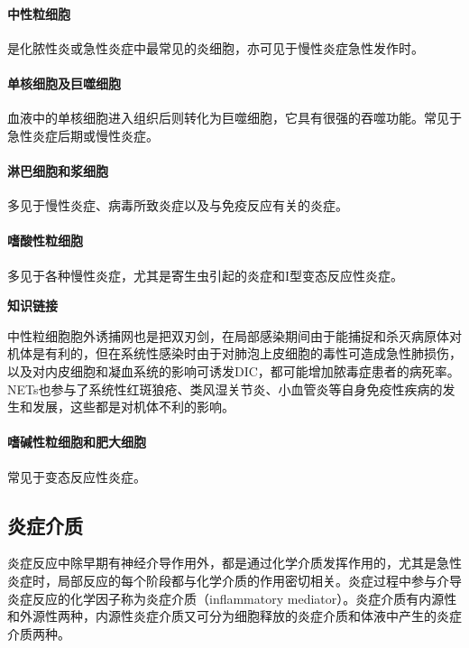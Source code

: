 \paragraph{中性粒细胞}
是化脓性炎或急性炎症中最常见的炎细胞，亦可见于慢性炎症急性发作时。

\paragraph{单核细胞及巨噬细胞}
血液中的单核细胞进入组织后则转化为巨噬细胞，它具有很强的吞噬功能。常见于急性炎症后期或慢性炎症。

\paragraph{淋巴细胞和浆细胞}
多见于慢性炎症、病毒所致炎症以及与免疫反应有关的炎症。

\paragraph{嗜酸性粒细胞}
多见于各种慢性炎症，尤其是寄生虫引起的炎症和I型变态反应性炎症。

\begin{center}
  \textbf{知识链接}
\end{center}

中性粒细胞胞外诱捕网也是把双刃剑，在局部感染期间由于能捕捉和杀灭病原体对机体是有利的，但在系统性感染时由于对肺泡上皮细胞的毒性可造成急性肺损伤，以及对内皮细胞和凝血系统的影响可诱发DIC，都可能增加脓毒症患者的病死率。NETs也参与了系统性红斑狼疮、类风湿关节炎、小血管炎等自身免疫性疾病的发生和发展，这些都是对机体不利的影响。

\paragraph{嗜碱性粒细胞和肥大细胞}
常见于变态反应性炎症。

\subsection{炎症介质}

炎症反应中除早期有神经介导作用外，都是通过化学介质发挥作用的，尤其是急性炎症时，局部反应的每个阶段都与化学介质的作用密切相关。炎症过程中参与介导炎症反应的化学因子称为炎症介质（inflammatory
mediator）。炎症介质有内源性和外源性两种，内源性炎症介质又可分为细胞释放的炎症介质和体液中产生的炎症介质两种。

